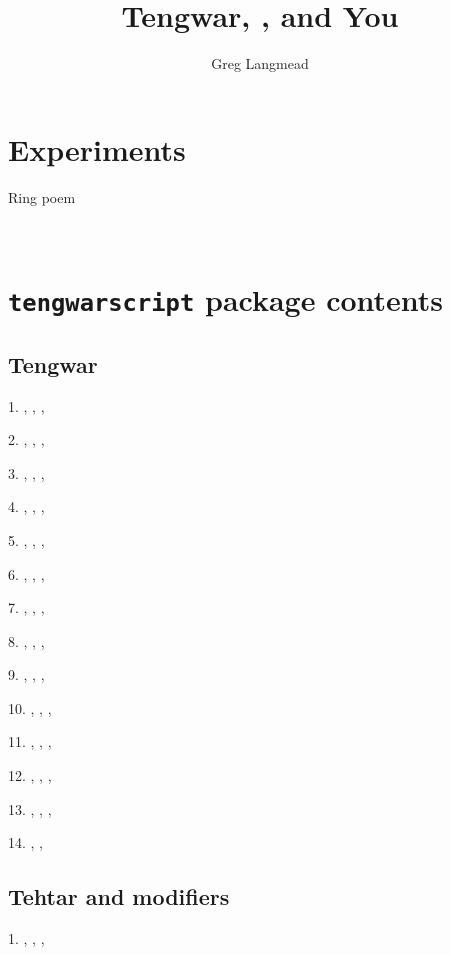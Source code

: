 \documentclass[14pt]{extarticle}
\title{Tengwar, \Ttinco\TTacute\Tungwe\TTthreedots\Toore, and You}
\author{Greg Langmead}
\newcommand{\Ash}{\Textendedcalma\TTthreedots}
\newcommand{\Ish}{\Textendedcalma\TTacute}
\newcommand{\Nazg}{\Tnuumen\Tessenuquerna\TTthreedots\Tungwe}
\newcommand{\Ur}{\Toore\TTrightcurl}
\newcommand{\Dur}{\Tando\Ur}
\newcommand{\At}{\Ttinco\TTthreedots}
\newcommand{\Ak}{\Tquesse\TTthreedots}
\newcommand{\Bat}{\Tumbar\At}
\newcommand{\Thrak}{\Tthuule\Troomen\Ak}
\newcommand{\Imb}{\Tumbar\TTdot\TTnasalizer}
\newcommand{\Imp}{\Tparma\TTdot\TTnasalizer}
\newcommand{\Ul}{\Tlambe\TTrightcurl}
\newcommand{\Um}{\Tmalta\TTrightcurl}
\newcommand{\Uk}{\Tquesse\TTdoublerightcurl}
\newcommand{\Uluk}{\Ul\Uk}
\newcommand{\I}{\Ttelco\TTacute}
\begin{document}
\maketitle
\section{Experiments}
Ring poem

\Ash\Nazg\Dur\Bat\Uluk
\,\Tcentereddot
\Ash\Nazg\Tungwe\Imb\At\Ul
\,\Tcentereddot
\Ash\Nazg\Thrak\At\Uluk
\,\Tcentereddot
\Textendedungwe\TTthreedots\Tumbar\Ur\Tesse\Um\Ish\I\Tquesse\Troomen\Imp\At\Ul

\section{\texttt{tengwarscript} package contents}
\subsection{Tengwar}

1. \Ttinco, \Tparma, \Tcalma, \Tquesse 

2. \Tando, \Tumbar, \Tanga, \Tungwe 

3. \Tthuule, \Tformen, \Taha, \Thwesta 

4. \Tanto, \Tampa, \Tanca, \Tunque 

5. \Tnuumen, \Tmalta, \Tnoldo, \Tnwalme 

6. \Toore, \Tvala, \Tanna, \Tvilya

7. \Textendedtinco, \Textendedparma, \Textendedcalma, \Textendedquesse

8. \Textendedando, \Textendedumbar, \Textendedanga, \Textendedungwe

9. \Troomen, \Tarda, \Tlambe, \Talda

10. \Troomenalt, \Tardaalt, \Tlambealt, \Tsilme

11. \Tsilmenuquerna, \Tesse, \Tessenuquerna, \Tsilmealt

12. \Tsilmenuquernaalt, \Tessealt, \Tessenuquernaalt, \Thyarmen

13. \Thalla, \Thwestasindarinwa, \Tyanta, \Tuure

14. \Tosse, \Ttelco, \Taara

\subsection{Tehtar and modifiers}

1. \Tlefthook, \Trighthook, \Tcurlyhook, \Tuphook
\end{document}
